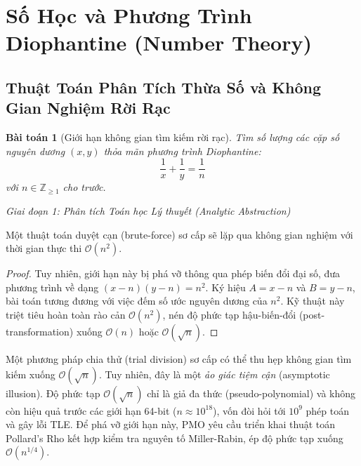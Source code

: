 \documentclass{article}
\newtheorem{baitoan}{Bài toán}
\begin{document}

\section{Số Học và Phương Trình Diophantine (Number Theory)}
\subsection{Thuật Toán Phân Tích Thừa Số và Không Gian Nghiệm Rời Rạc}
\begin{baitoan}[Giới hạn không gian tìm kiếm rời rạc]
	Tìm số lượng các cặp số nguyên dương $(x,y)$ thỏa mãn phương trình Diophantine:
	\begin{equation*}
		\frac{1}{x} + \frac{1}{y} = \frac{1}{n}
	\end{equation*}
	với $n\in\mathbb{Z}_{\ge1}$ cho trước.
\end{baitoan}

\vspace{0.5em}\noindent\emph{Giai đoạn 1: Phân tích Toán học Lý thuyết (Analytic Abstraction)}

Một thuật toán duyệt cạn (brute-force) sơ cấp sẽ lặp qua không gian nghiệm với thời gian thực thi $\mathcal{O}(n^2)$. 
\begin{proof}
Tuy nhiên, giới hạn này bị phá vỡ thông qua phép biến đổi đại số, đưa phương trình về dạng $(x-n)(y-n) = n^2$. Ký hiệu $A = x-n$ và $B = y-n$, bài toán tương đương với việc đếm số ước nguyên dương của $n^2$. Kỹ thuật này triệt tiêu hoàn toàn rào cản $\mathcal{O}(n^2)$, nén độ phức tạp hậu-biến-đổi (post-transformation) xuống $\mathcal{O}(n)$ hoặc $\mathcal{O}(\sqrt{n})$.
\end{proof}
Một phương pháp chia thử (trial division) sơ cấp có thể thu hẹp không gian tìm kiếm xuống $\mathcal{O}(\sqrt{n})$. Tuy nhiên, đây là một \textit{ảo giác tiệm cận} (asymptotic illusion). Độ phức tạp $\mathcal{O}(\sqrt{n})$ chỉ là giả đa thức (pseudo-polynomial) và không còn hiệu quả trước các giới hạn 64-bit ($n \approx 10^{18}$), vốn đòi hỏi tới $10^9$ phép toán và gây lỗi TLE. Để phá vỡ giới hạn này, PMO yêu cầu triển khai thuật toán Pollard's Rho kết hợp kiểm tra nguyên tố Miller-Rabin, ép độ phức tạp xuống $\mathcal{O}(n^{1/4})$.
\end{document}
